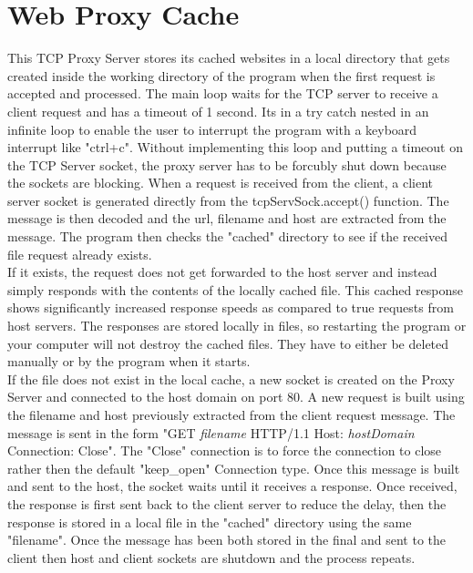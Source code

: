 \documentclass[11pt]{article}
\begin{document}
\section{Web Proxy Cache}
    This TCP Proxy Server stores its cached websites in a local directory that gets created inside the working directory of the program when the first request is accepted and processed. The main loop waits for the TCP server to receive a client request and has a timeout of 1 second. Its in a try catch nested in an infinite loop to enable the user to interrupt the program with a keyboard interrupt like "ctrl+c". Without implementing this loop and putting a timeout on the TCP Server socket, the proxy server has to be forcubly shut down because the sockets are blocking. When a request is received from the client, a client server socket is generated directly from the tcpServSock.accept() function. The message is then decoded and the url, filename and host are extracted from the message. The program then checks the "cached" directory to see if the received file request already exists.\\ 
    
    If it exists, the request does not get forwarded to the host server and instead simply responds with the contents of the locally cached file. This cached response shows significantly increased response speeds as compared to true requests from host servers. The responses are stored locally in files, so restarting the program or your computer will not destroy the cached files. They have to either be deleted manually or by the program when it starts. \\
    
    If the file does not exist in the local cache, a new socket is created on the Proxy Server and connected to the host domain on port 80. A new request is built using  the filename and host previously extracted from the client request message. The message is sent in the form "GET \textit{filename} HTTP/1.1 Host: \textit{hostDomain} Connection: Close". The "Close" connection is to force the connection to close rather then the default "keep\_open" Connection type. Once this message is built  and sent to the host, the socket waits until it receives a response. Once received, the response is first sent back to the client server to reduce the delay, then the response is stored in a local file in the "cached" directory using the same "filename". Once the message has been both stored in the final and sent to the client then host and client sockets are shutdown and the process repeats. \\
    
\end{document}
